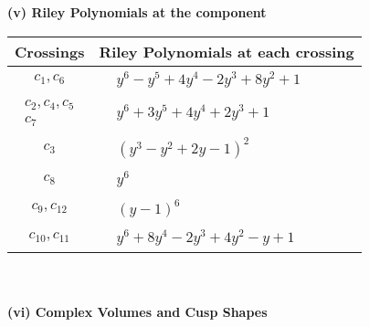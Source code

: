 \documentclass[1p]{elsarticle_modified}
\theoremstyle{definition}
\begin{document}
\newpage\renewcommand{\arraystretch}{1}
\flushleft \textbf{(v) Riley Polynomials at the component}\newline \\
\begin{tabular}{m{50pt}|m{274pt}}
Crossings & \hspace{64pt}Riley Polynomials at each crossing \\
\hline $$\begin{aligned}c_{1},c_{6}\end{aligned}$$&$\begin{aligned}
&y^6- y^5+4 y^4-2 y^3+8 y^2+1
\end{aligned}$\\
\hline $$\begin{aligned}c_{2},c_{4},c_{5}\\c_{7}\end{aligned}$$&$\begin{aligned}
&y^6+3 y^5+4 y^4+2 y^3+1
\end{aligned}$\\
\hline $$\begin{aligned}c_{3}\end{aligned}$$&$\begin{aligned}
&(y^3- y^2+2 y-1)^2
\end{aligned}$\\
\hline $$\begin{aligned}c_{8}\end{aligned}$$&$\begin{aligned}
&y^6
\end{aligned}$\\
\hline $$\begin{aligned}c_{9},c_{12}\end{aligned}$$&$\begin{aligned}
&(y-1)^6
\end{aligned}$\\
\hline $$\begin{aligned}c_{10},c_{11}\end{aligned}$$&$\begin{aligned}
&y^6+8 y^4-2 y^3+4 y^2- y+1
\end{aligned}$\\
\hline
\end{tabular}\\~\\
\newpage\flushleft \textbf{(vi) Complex Volumes and Cusp Shapes}
\end{document}
